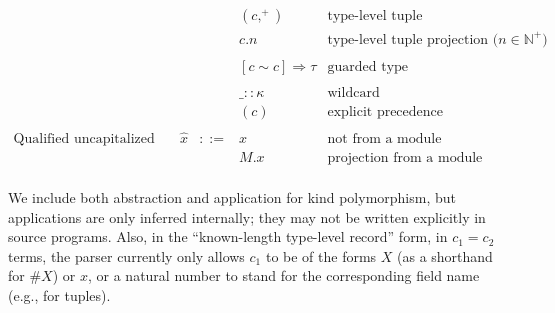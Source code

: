 \documentclass{article}
\begin{document}
$$\begin{array}{rrcll}
  &&& (c,^+) & \textrm{type-level tuple} \\
  &&& c.n & \textrm{type-level tuple projection ($n \in \mathbb N^+$)} \\
  \\
  &&& [c \sim c] \Rightarrow \tau & \textrm{guarded type} \\
  \\
  &&& \_ :: \kappa & \textrm{wildcard} \\
  &&& (c) & \textrm{explicit precedence} \\
  \\
  \textrm{Qualified uncapitalized variables} & \hat{x} &::=& x & \textrm{not from a module} \\
  &&& M.x & \textrm{projection from a module} \\
\end{array}$$

We include both abstraction and application for kind polymorphism, but applications are only inferred internally; they may not be written explicitly in source programs.  Also, in the ``known-length type-level record'' form, in $c_1 = c_2$ terms, the parser currently only allows $c_1$ to be of the forms $X$ (as a shorthand for $\#X$) or $x$, or a natural number to stand for the corresponding field name (e.g., for tuples).
\end{document}
